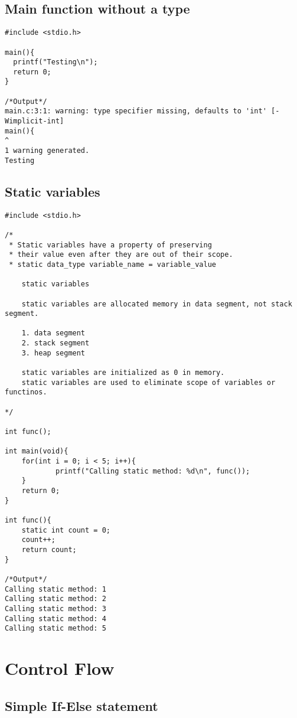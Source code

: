 \documentclass[10pt, a4paper, twocolumn]{article} %
\begin{document}
\subsection{Main function without a type}

\begin{lstlisting}
#include <stdio.h>

main(){
  printf("Testing\n");
  return 0;
}

/*Output*/
main.c:3:1: warning: type specifier missing, defaults to 'int' [-Wimplicit-int]
main(){
^
1 warning generated.
Testing
\end{lstlisting}

\subsection{Static variables}

\begin{lstlisting}
#include <stdio.h>

/*
 * Static variables have a property of preserving
 * their value even after they are out of their scope.
 * static data_type variable_name = variable_value

	static variables

	static variables are allocated memory in data segment, not stack segment.

	1. data segment
	2. stack segment
	3. heap segment

	static variables are initialized as 0 in memory.
	static variables are used to eliminate scope of variables or functinos.

*/

int func();

int main(void){
	for(int i = 0; i < 5; i++){
			printf("Calling static method: %d\n", func());
	}
	return 0;
}

int func(){
	static int count = 0;
	count++;
	return count;
}

/*Output*/
Calling static method: 1
Calling static method: 2
Calling static method: 3
Calling static method: 4
Calling static method: 5
\end{lstlisting}

\section{Control Flow}

\subsection{Simple If-Else statement}
\end{document}
